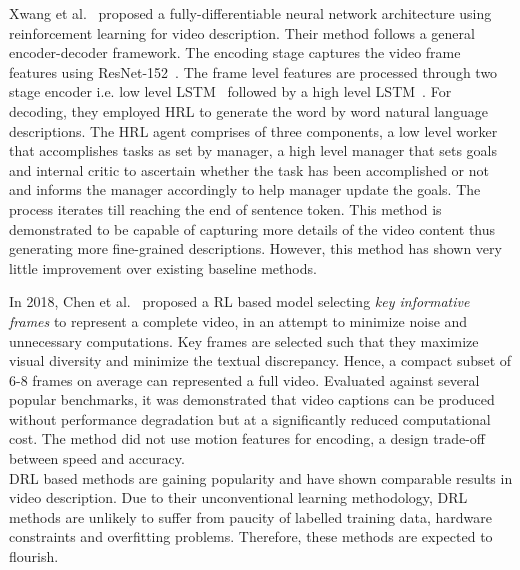 \documentclass[10pt,journal,compsoc]{IEEEtran}
\begin{document}
Xwang et al.~\cite{wang2017video} proposed a fully-differentiable neural network architecture using reinforcement learning for video description. Their method follows a general encoder-decoder framework. The encoding stage captures the video frame features using ResNet-152~\cite{he2016deep}. The frame level features are processed through two stage encoder i.e. low level LSTM~\cite{schuster1997bidirectional} followed by a high level LSTM~\cite{hochreiter1997long}.
For decoding, they employed HRL to generate the word by word natural language descriptions. 
The HRL agent comprises of three components, a low level worker that accomplishes tasks as set by manager, a high level manager that sets goals and internal critic to ascertain whether the task has been accomplished or not and informs the manager accordingly to help manager update the goals. 
The process iterates till reaching the end of sentence token. This method is demonstrated to be capable of capturing more details of the video content thus generating more fine-grained descriptions. However, this method has shown very little improvement over existing baseline methods.

In 2018, Chen et al.~\cite{chen2018less} proposed a RL based model selecting \textit{key informative frames} to represent a complete video, in an attempt to minimize noise and unnecessary computations. Key frames are selected such that they maximize visual diversity and minimize the textual discrepancy. Hence, a compact subset of 6-8 frames on average can represented a full video. Evaluated against several popular benchmarks, it was demonstrated that video captions can be produced without performance degradation but at a significantly reduced computational cost. The method did not use motion features for encoding, a design trade-off between speed and accuracy. \\
DRL based methods are gaining popularity and have shown comparable results in video description. Due to their unconventional learning methodology, DRL methods are unlikely to suffer from paucity of labelled training data, hardware constraints and overfitting problems. Therefore, these methods are expected to flourish.
\end{document}
